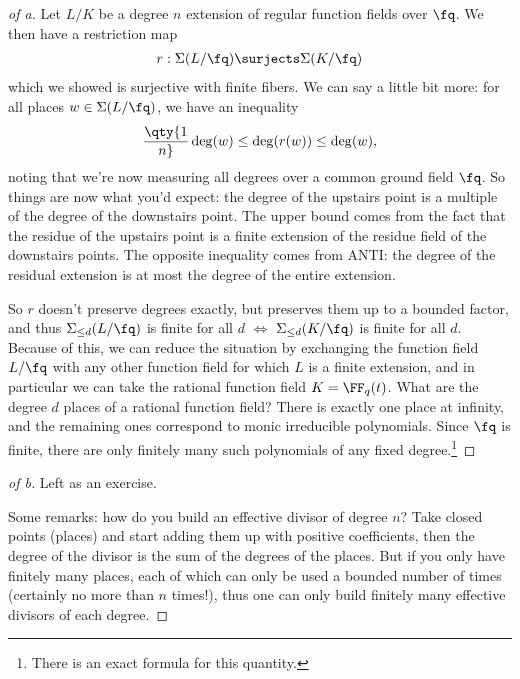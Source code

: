 \begin{proof}[of a]

Let \(L/K\) be a degree \(n\) extension of regular function fields over
\(\fq\). We then have a restriction map
\begin{align*}  
r: \Sigma(L/\fq) \surjects \Sigma(K/\fq)
\end{align*} which we showed is surjective with finite fibers. We can
say a little bit more: for all places \(w \in \Sigma(L/\fq)\), we have
an inequality
\begin{align*}  
\qty{1\over n}\deg(w) \leq \deg(r(w)) \leq \deg(w)
,\end{align*} noting that we're now measuring all degrees over a common
ground field \(\fq\). So things are now what you'd expect: the degree of
the upstairs point is a multiple of the degree of the downstairs point.
The upper bound comes from the fact that the residue of the upstairs
point is a finite extension of the residue field of the downstairs
points. The opposite inequality comes from ANTI: the degree of the
residual extension is at most the degree of the entire extension.

So \(r\) doesn't preserve degrees exactly, but preserves them up to a
bounded factor, and thus \(\Sigma_{\leq d}(L/\fq)\) is finite for all
\(d\) \(\iff\) \(\Sigma_{\leq d}(K/\fq)\) is finite for all \(d\).
Because of this, we can reduce the situation by exchanging the function
field \(L/\fq\) with any other function field for which \(L\) is a
finite extension, and in particular we can take the rational function
field \(K = \FF_q(t)\). What are the degree \(d\) places of a rational
function field? There is exactly one place at infinity, and the
remaining ones correspond to monic irreducible polynomials. Since
\(\fq\) is finite, there are only finitely many such polynomials of any
fixed degree.\footnote{There is an exact formula for this quantity.}

\end{proof}

\begin{proof}[of b]

Left as an exercise.

Some remarks: how do you build an effective divisor of degree \(n\)?
Take closed points (places) and start adding them up with positive
coefficients, then the degree of the divisor is the sum of the degrees
of the places. But if you only have finitely many places, each of which
can only be used a bounded number of times (certainly no more than \(n\)
times!), thus one can only build finitely many effective divisors of
each degree.

\end{proof}

